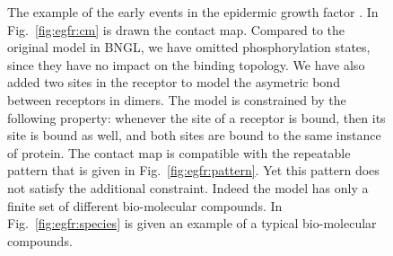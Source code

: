 \documentclass{entcs}
\begin{document}
\begin{figure}[t]
  \begin{minipage}{0.4\linewidth}%
\end{minipage}
\caption{The example of the early events in the epidermic growth factor \cite{Blinov-2006-ANM}. In Fig.~\ref{fig:egfr:cm} is drawn the contact map. Compared to the original model in BNGL, we have omitted phosphorylation states, since they have no impact on the binding topology. We have also
added two sites in the receptor to model the asymetric bond between receptors  in dimers.
The model is constrained by the following property: whenever the site  of a receptor  is bound, then its site  is bound as well, and both sites are bound to the same instance
of protein. The contact map is compatible with the repeatable pattern that is given in Fig.~\ref{fig:egfr:pattern}. Yet this pattern does not satisfy the additional constraint. Indeed the model has only a finite set of different bio-molecular compounds. In Fig.~\ref{fig:egfr:species} is given an example of a typical bio-molecular compounds.}
\label{fig:egfr}
 \end{figure}
\end{document}
